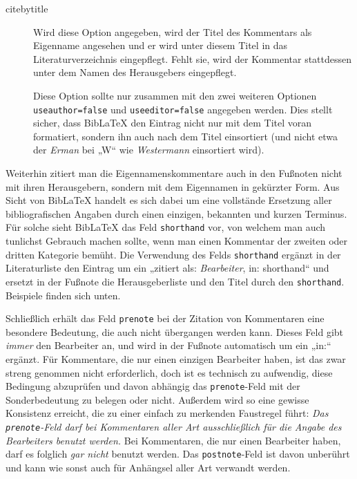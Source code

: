 \documentclass[11pt,a4paper,DIV=calc]{scrartcl}
\newcommand\software[1]{\textsf{#1}}
\newcommand\Biblatex{\software{Bib\LaTeX{}}\xspace}
\newcommand\name[1]{\textit{#1}}
\begin{document}
\begin{description}
\item[citebytitle] Wird diese Option angegeben, wird der Titel des
  Kommentars als Eigenname angesehen und er wird unter diesem Titel in
  das Literaturverzeichnis eingepflegt. Fehlt sie, wird der Kommentar
  stattdessen unter dem Namen des Herausgebers eingepflegt.

  Diese Option sollte nur zusammen mit den zwei weiteren Optionen
  \verb+useauthor=false+ und \verb+useeditor=false+ angegeben
  werden. Dies stellt sicher, dass \Biblatex den Eintrag nicht nur mit
  dem Titel voran formatiert, sondern ihn auch nach dem Titel
  einsortiert (und nicht etwa der \name{Erman} bei „W“ wie
  \name{Westermann} einsortiert wird).
\end{description}

Weiterhin zitiert man die Eigennamenskommentare auch in den Fußnoten nicht
mit ihren Herausgebern, sondern mit dem Eigennamen in gekürzter
Form. Aus Sicht von \Biblatex handelt es sich dabei um eine vollstände
Ersetzung aller bibliografischen Angaben durch einen einzigen,
bekannten und kurzen Terminus. Für solche sieht \Biblatex das Feld
\verb+shorthand+ vor, von welchem man auch tunlichst Gebrauch machen
sollte, wenn man einen Kommentar der zweiten oder dritten Kategorie
bemüht. Die Verwendung des Felds \verb+shorthand+ ergänzt in der
Literaturliste den Eintrag um ein „zitiert als: \name{Bearbeiter}, in:
shorthand“ und ersetzt in der Fußnote die Herausgeberliste und den
Titel durch den \verb+shorthand+. Beispiele finden sich unten.

Schließlich erhält das Feld \verb+prenote+ bei der Zitation von
Kommentaren eine besondere Bedeutung, die auch nicht übergangen werden
kann. Dieses Feld gibt \emph{immer} den Bearbeiter an, und wird in der
Fußnote automatisch um ein „in:“ ergänzt. Für Kommentare, die nur
einen einzigen Bearbeiter haben, ist das zwar streng genommen nicht
erforderlich, doch ist es technisch zu aufwendig, diese Bedingung
abzuprüfen und davon abhängig das \verb+prenote+-Feld mit der
Sonderbedeutung zu belegen oder nicht. Außerdem wird so eine gewisse
Konsistenz erreicht, die zu einer einfach zu merkenden Faustregel
führt: \emph{Das \texttt{prenote}-Feld darf bei Kommentaren aller Art
  ausschließlich für die Angabe des Bearbeiters benutzt werden.} Bei
Kommentaren, die nur einen Bearbeiter haben, darf es folglich
\emph{gar nicht} benutzt werden. Das \verb+postnote+-Feld ist davon
unberührt und kann wie sonst auch für Anhängsel aller Art verwandt
werden.
\end{document}
